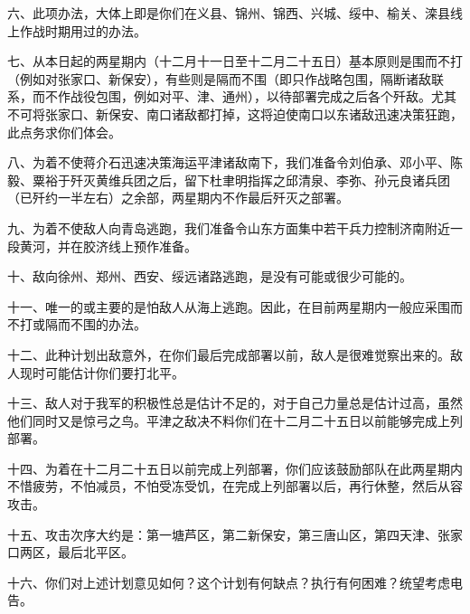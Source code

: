 六、此项办法，大体上即是你们在义县、锦州、锦西、兴城、绥中、榆关、滦县线上作战时期用过的办法。

七、从本日起的两星期内（十二月十一日至十二月二十五日）基本原则是围而不打（例如对张家口、新保安），有些则是隔而不围（即只作战略包围，隔断诸敌联系，而不作战役包围，例如对平、津、通州），以待部署完成之后各个歼敌。尤其不可将张家口、新保安、南口诸敌都打掉，这将迫使南口以东诸敌迅速决策狂跑，此点务求你们体会。

八、为着不使蒋介石迅速决策海运平津诸敌南下，我们准备令刘伯承、邓小平、陈毅、粟裕于歼灭黄维兵团之后，留下杜聿明指挥之邱清泉、李弥、孙元良诸兵团（已歼约一半左右）之余部，两星期内不作最后歼灭之部署。

九、为着不使敌人向青岛逃跑，我们准备令山东方面集中若干兵力控制济南附近一段黄河，并在胶济线上预作准备。

十、敌向徐州、郑州、西安、绥远诸路逃跑，是没有可能或很少可能的。

十一、唯一的或主要的是怕敌人从海上逃跑。因此，在目前两星期内一般应采围而不打或隔而不围的办法。

十二、此种计划出敌意外，在你们最后完成部署以前，敌人是很难觉察出来的。敌人现时可能估计你们要打北平。

十三、敌人对于我军的积极性总是估计不足的，对于自己力量总是估计过高，虽然他们同时又是惊弓之鸟。平津之敌决不料你们在十二月二十五日以前能够完成上列部署。

十四、为着在十二月二十五日以前完成上列部署，你们应该鼓励部队在此两星期内不惜疲劳，不怕减员，不怕受冻受饥，在完成上列部署以后，再行休整，然后从容攻击。

十五、攻击次序大约是：第一塘芦区，第二新保安，第三唐山区，第四天津、张家口两区，最后北平区。

十六、你们对上述计划意见如何？这个计划有何缺点？执行有何困难？统望考虑电告。


